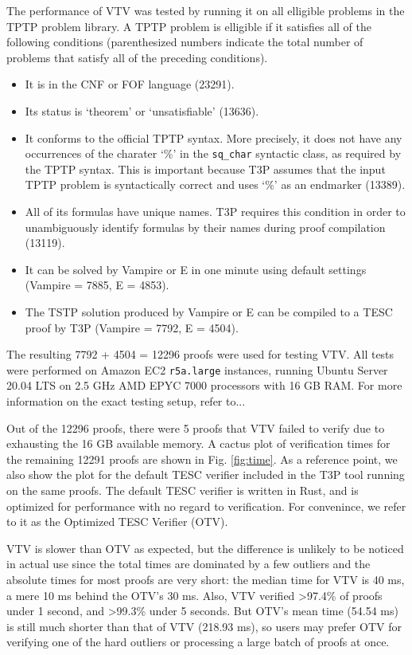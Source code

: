 \documentclass[12pt]{article}
\begin{document}
The performance of VTV was tested by running it on all elligible problems 
in the TPTP \cite{} problem library. A TPTP problem is elligible if it 
satisfies all of the following conditions (parenthesized numbers indicate 
the total number of problems that satisfy all of the preceding conditions).
\begin{itemize}
  \item It is in the CNF or FOF language (23291). 
  \item Its status is `theorem' or `unsatisfiable' (13636).
  \item It conforms to the official TPTP syntax. More precisely, 
    it does not have any occurrences of the charater `\%' in the 
    \verb|sq_char| syntactic class, as required by the TPTP syntax.
    This is important because T3P assumes that the input TPTP problem 
    is syntactically correct and uses `\%' as an endmarker (13389).
  \item All of its formulas have unique names. T3P requires this condition 
    in order to unambiguously identify formulas by their names during 
    proof compilation (13119).
  \item It can be solved by Vampire or E in one minute using 
    default settings (Vampire = 7885, E = 4853).
  \item The TSTP solution produced by Vampire or E can be compiled to 
    a TESC proof by T3P (Vampire = 7792, E = 4504).
\end{itemize}
The resulting 7792 + 4504 = 12296 proofs were used for testing VTV.
All tests were performed on Amazon EC2 \texttt{r5a.large} instances, 
running Ubuntu Server 20.04 LTS on 2.5 GHz AMD EPYC 7000 processors with 
16 GB RAM. For more information on the exact testing setup, refer to...

Out of the 12296 proofs, there were 5 proofs that VTV failed to verify 
due to exhausting the 16 GB available memory. A cactus plot of verification 
times for the remaining 12291 proofs are shown in Fig. \ref{fig:time}. 
As a reference point, we also show the plot for the default TESC verifier 
included in the T3P tool running on the same proofs. The default TESC verifier 
is written in Rust, and is optimized for performance with no regard to 
verification. For convenince, we refer to it as the Optimized TESC Verifier (OTV).



VTV is slower than OTV as expected, but the difference is unlikely
to be noticed in actual use since the total times are dominated by a few 
outliers and the absolute times for most proofs are very short: the median 
time for VTV is 40 ms, a mere 10 ms behind the OTV's 30 ms. Also,
VTV verified >97.4\% of proofs under 1 second, and >99.3\% under 5 seconds. 
But OTV's mean time (54.54 ms) is still much shorter than that of VTV (218.93 ms),
so users may prefer OTV for verifying one of the hard outliers or processing
a large batch of proofs at once.
\end{document}
